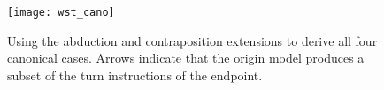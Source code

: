 \begin{figure}
\centering \texttt{[image: wst\_cano]}
\caption{Using the abduction and contraposition extensions to derive all four canonical cases. Arrows indicate that the origin model produces a subset of the turn instructions of the endpoint.}
\label{fig:wstcano}
\end{figure}




















